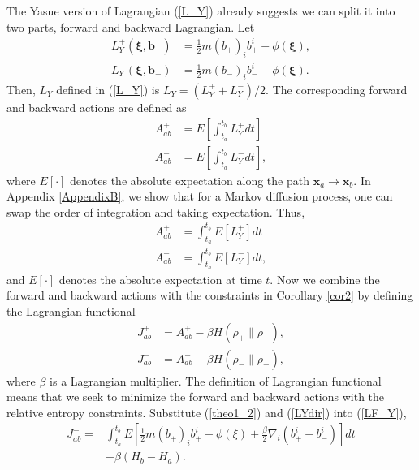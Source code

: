 \documentclass[%
 aip, 
 amsmath,amssymb,amsthm,
 nofootinbib,
 reprint,
]{revtex4-1}
\begin{document}
The Yasue version of Lagrangian (\ref{L_Y}) already suggests we can split it into two parts, forward and backward Lagrangian. Let
\begin{equation}
\label{LYdir}
\begin{split}
    L_{Y}^+(\mathbf{\xi, b_+}) &= \frac{1}{2}m(b_+)_ib_+^i - \phi(\mathbf{\xi}), \\
    L_{Y}^-(\mathbf{\xi, b_-}) &= \frac{1}{2}m(b_-)_ib_-^i - \phi(\mathbf{\xi}).
    \end{split}
\end{equation}
Then, $L_{Y}$ defined in (\ref{L_Y}) is $L_Y=(L_{Y}^++L_{Y}^-)/2$. The corresponding forward and backward actions are defined as
\begin{equation}
    \label{YAction}
    \begin{split}
    A_{ab}^+ &= E[\int_{t_a}^{t_b} L_{Y}^+dt] \\
    A_{ab}^- &= E[\int_{t_a}^{t_b} L_{Y}^-dt],
    \end{split}
\end{equation}
where $E[\cdot]$ denotes the absolute expectation along the path $\mathbf{x}_a \to \mathbf{x}_b$. In Appendix \ref{AppendixB}, we show that for a Markov diffusion process, one can swap the order of integration and taking expectation. Thus,
\begin{equation}
    \label{YAction2}
    \begin{split}
    A_{ab}^+ &= \int_{t_a}^{t_b} E[L_{Y}^+]dt \\
    A_{ab}^- &= \int_{t_a}^{t_b} E[L_{Y}^-]dt,
    \end{split}
\end{equation}
and $E[\cdot]$ denotes the absolute expectation at time $t$. Now we combine the forward and backward actions with the constraints in Corollary \ref{cor2} by defining the Lagrangian functional
\begin{equation}
\label{LF_Y}
\begin{split}
    J_{ab}^+ &= A_{ab}^+ - \beta H(\rho_+\|\rho_-), \\
    J_{ab}^- &= A_{ab}^- - \beta H(\rho_-\|\rho_+), 
\end{split}
\end{equation}
where $\beta$ is a Lagrangian multiplier. The definition of Lagrangian functional means that we seek to minimize the forward and backward actions with the relative entropy constraints. Substitute (\ref{theo1_2}) and (\ref{LYdir}) into (\ref{LF_Y}),
\begin{equation}
\label{LF_Y2}
    \begin{split}
    J_{ab}^+ =& \int_{t_a}^{t_b} E[\frac{1}{2}m(b_+)_ib_+^i - \phi(\xi)  +\frac{\beta}{2}\nabla_i(b_+^i + b_-^i)]dt\\
    & -\beta(H_b - H_a).
    \end{split}
\end{equation}
\end{document}
